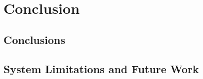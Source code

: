 \chapter{Conclusion}
\chaptoc
\label{chap:conclusion}
\bigskip

 
\section{Conclusions}

\section{System Limitations and Future Work}
